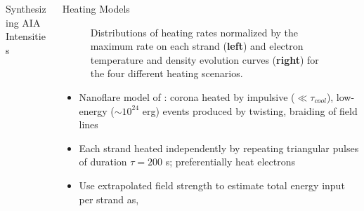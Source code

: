 \documentclass[final]{beamer}
\begin{document}
\begin{frame}
\begin{columns}[T]
\begin{column}{0.49\linewidth}
\begin{block}{Synthesizing AIA Intensities}
\begin{figure}
            \label{fig:synthesized_aia_maps}
            \centering
        \end{figure}
    \end{block}
  \end{column}
  \begin{column}{0.49\linewidth}
    \begin{block}{Heating Models}
        \begin{figure}
            \caption{Distributions of heating rates normalized by the maximum rate on each strand (\textbf{left}) and electron temperature and density evolution curves (\textbf{right}) for the four different heating scenarios.}
            \label{fig:wait_time_and_hydro}             
        \end{figure}
        \begin{itemize}
        \item Nanoflare model of \citet{parker_nanoflares_1988}: corona heated by impulsive ($\ll\tau_{cool}$), low-energy ($\sim10^{24}$ erg) events produced by twisting, braiding of field lines
        \item Each strand heated independently by repeating triangular pulses of duration $\tau=200$ s; preferentially heat electrons 
        \item Use extrapolated field strength to estimate total energy input per strand as,

\end{itemize}
\end{block}
\end{column}
\end{columns}
\end{frame}
\end{document}
